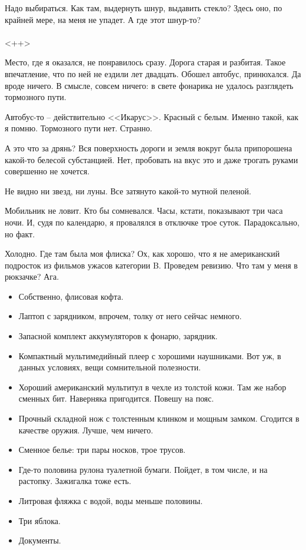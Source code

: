 \documentclass[a4paper]{book}
\begin{document}
Надо выбираться. Как там, выдернуть шнур, выдавить стекло? Здесь оно, по крайней мере, на меня не упадет. А где этот шнур-то? 
\\
\paragraph{}<++>


Место, где я оказался, не понравилось сразу. Дорога старая и разбитая. Такое впечатление, что по ней не ездили лет двадцать. Обошел автобус, принюхался. Да вроде ничего. В смысле, совсем ничего: в свете фонарика не удалось разглядеть тормозного пути. 

Автобус-то -- действительно <<Икарус>>. Красный с белым. Именно такой, как я помню. Тормозного пути нет. Странно. 

А это что за дрянь? Вся поверхность дороги и земля вокруг была припорошена какой-то белесой субстанцией. Нет, пробовать на вкус это и даже трогать руками совершенно не хочется.

Не видно ни звезд, ни луны. Все затянуто какой-то мутной пеленой. 

Мобильник не ловит. Кто бы сомневался. Часы, кстати, показывают три часа ночи. И, судя по календарю, я провалялся в отключке трое суток. Парадоксально, но факт.

Холодно. Где там была моя флиска? Ох, как хорошо, что я не американский подросток из фильмов ужасов категории B. Проведем ревизию. Что там у меня в рюкзачке? Ага.
\begin{itemize}
	\item Собственно, флисовая кофта. 
	\item Лаптоп с зарядником, впрочем, толку от него сейчас немного.
	\item Запасной комплект аккумуляторов к фонарю, зарядник.
	\item Компактный мультимедийный плеер с хорошими наушниками. Вот уж, в данных условиях, вещи сомнительной полезности.
	\item Хороший американский мультитул в чехле из толстой кожи. Там же набор сменных бит. Наверняка пригодится. Повешу на пояс.
	\item Прочный складной нож с толстенным клинком и мощным замком. Сгодится в качестве оружия. Лучше, чем ничего.
	\item Сменное белье: три пары носков, трое трусов. 
	\item Где-то половина рулона туалетной бумаги. Пойдет, в том числе, и на растопку. Зажигалка тоже есть.
	\item Литровая фляжка с водой, воды меньше половины.
	\item Три яблока.
	\item Документы. 
\end{itemize}
\end{document}

